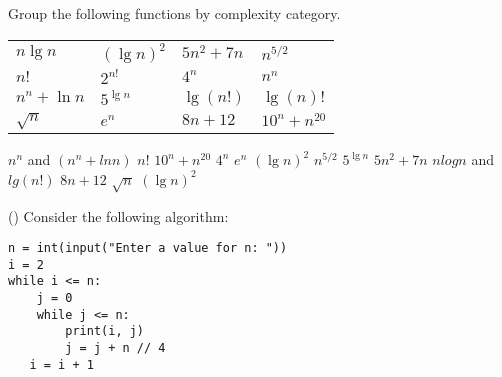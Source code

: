 \documentclass[11pt]{article}
\begin{document}
\begin{questions}
\ifprintanswers
\newpage
\else
\bigskip
\fi


\question[10]
Group the following functions by complexity category.\\
\begin{tabular}{llll}
	$n \lg n$     & $(\lg n)^2$ & $5n^2 + 7n$ & $n^{5/2}$     \\
	$n!$          & $2^{n!}$    & $4^n$       & $n^n$         \\
	$n^n + \ln n$ & $5^{\lg n}$ & $\lg(n!)$   & $\lg(n)!$     \\
	$\sqrt{n}$    & $e^n$       & $8n+12$     & $10^n+n^{20}$
\end{tabular}
	
\begin{solutionorbox}
	\newline
	 $n^n$ and $(n^n  + ln  n)$ \newline
	$n!$ \newline
	$10^n + n^20$\newline
	$4^n$ \newline
	$e^n$ \newline
	$(\lg n)^2$ \newline
	$n^{5/2}$ \newline
	$5^{\lg n}$ \newline
	$5n^2 + 7n$ \newline
	$n log n$ and $lg(n!)$ \newline
	$8n + 12$ \newline
	$\sqrt{n}$  \newline
	$(\lg n)^2$ \newline
\end{solutionorbox}

\ifprintanswers
\newpage
\else
\bigskip
\fi


\question (\totalpoints {})
Consider the following algorithm:
\begin{verbatim}
n = int(input("Enter a value for n: "))
i = 2
while i <= n:
    j = 0
    while j <= n:
        print(i, j)
        j = j + n // 4
   i = i + 1
\end{verbatim}

\end{questions}
\end{document}
